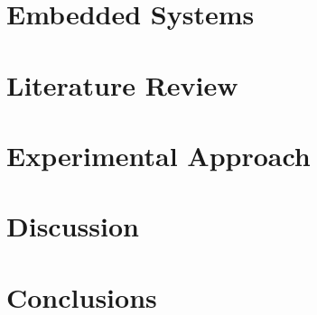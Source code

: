\documentclass[11pt,oneside]{book}
\begin{document}
    \chapter{Embedded Systems}
    

    \chapter{Literature Review}
    

    \chapter{Experimental Approach}
    

    \chapter{Discussion}
    

    \chapter{Conclusions}
    

    \nocite{*}
    \printbibliography[title={Bibliography}] 

    \begin{appendices}
        
        
        
        
        
    \end{appendices}
\end{document}
